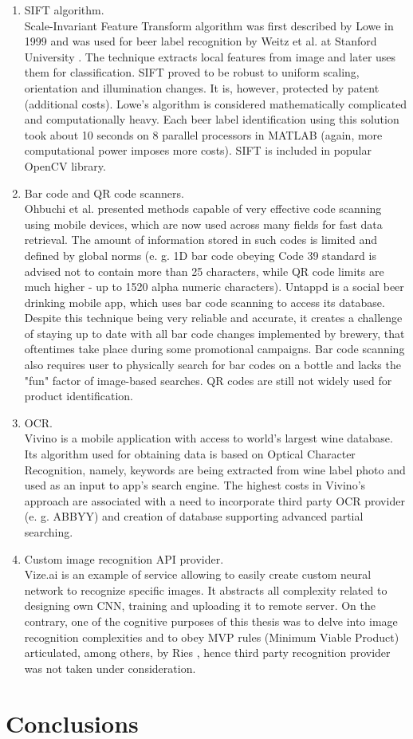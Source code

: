 \documentclass[11pt]{article}
\begin{document}
\begin{enumerate}[1)]
\item SIFT algorithm.\\
Scale-Invariant Feature Transform algorithm was first described by Lowe in 1999 \cite{lowe_sift} and was used for beer label recognition by Weitz et al. at Stanford University \cite{beer_sift}. The technique extracts local features from image and later uses them for classification. SIFT proved to be robust to uniform scaling, orientation and illumination changes. It is, however, protected by patent (additional costs). Lowe's algorithm is considered mathematically complicated and computationally heavy. Each beer label identification using this solution took about 10 seconds on 8 parallel processors in MATLAB (again, more computational power imposes more costs). SIFT is included in popular OpenCV library.
\item Bar code and QR code scanners.\\
Ohbuchi et al. \cite{barcode_mobile} presented methods capable of very effective code scanning using mobile devices, which are now used across many fields for fast data retrieval. The amount of information stored in such codes is limited and defined by global norms (e. g. 1D bar code obeying Code 39 standard is advised not to contain more than 25 characters, while QR code limits are much higher - up to 1520 alpha numeric characters). Untappd is a social beer drinking mobile app, which uses bar code scanning to access its database. Despite this technique being very reliable and accurate, it creates a challenge of staying up to date with all bar code changes implemented by brewery, that oftentimes take place during some promotional campaigns. Bar code scanning also requires user to physically search for bar codes on a bottle and lacks the "fun" factor of image-based searches. QR codes are still not widely used for product identification.
\item OCR.\\
Vivino is a mobile application with access to world's largest wine database. Its algorithm used for obtaining data is based on Optical Character Recognition, namely, keywords are being extracted from wine label photo and used as an input to app's search engine. The highest costs in Vivino's approach are associated with a need to incorporate third party OCR provider (e. g. ABBYY) and creation of database supporting advanced partial searching. 
\item Custom image recognition API provider.\\
Vize.ai is an example of service allowing to easily create custom neural network to recognize specific images. It abstracts all complexity related to designing own CNN, training and uploading it to remote server. On the contrary, one of the cognitive purposes of this thesis was to delve into image recognition complexities and to obey MVP rules (Minimum Viable Product) articulated, among others, by Ries \cite{lean_startup}, hence third party recognition provider was not taken under consideration.
\end{enumerate} 
\clearpage

\section{Conclusions} \label{conclusions}

\clearpage



\end{document}
